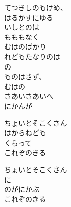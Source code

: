 \documentclass[10pt,b5j]{tarticle} %
\begin{document}
\vspace{1.5em} %
\newcommand{\linespace}{0.5em} %
\newcommand{\blocksize}{0.5\hsize} %
\begin{enumerate} %
    \begin{minipage}[c]{\blocksize}
    
        \vspace{\linespace}
        \item
        てつきしのもけめ、\\
        はるかすにゆる\\
        いしとのは\\
        もももなく\\
        むはのばかり\\
        れどもたなりのは\\
        の\\
        ものはさず、\\
        むはの\\
        さあいさあいへ\\
        にかんが
        
        \vspace{\linespace}
        \item
        ちょいとそこくさん\\
        はからねども\\
        くらって\\
        これぞのきる
        
        \vspace{\linespace}
        \item
        ちょいとそこくさん\\
        に\\
        のがにかぶ\\
        これぞのきる
        

\end{minipage}
\end{enumerate}
\end{document}
